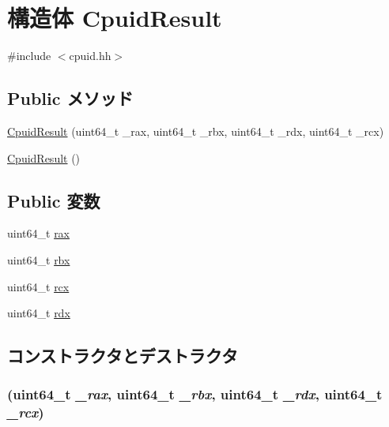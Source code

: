 \hypertarget{structX86ISA_1_1CpuidResult}{
\section{構造体 CpuidResult}
\label{structX86ISA_1_1CpuidResult}
}


{\ttfamily \#include $<$cpuid.hh$>$}\subsection*{Public メソッド}
\begin{DoxyCompactItemize}
\item 
\hyperlink{structX86ISA_1_1CpuidResult_a11f83822fc21427409a8828ac1ac953a}{CpuidResult} (uint64\_\-t \_\-rax, uint64\_\-t \_\-rbx, uint64\_\-t \_\-rdx, uint64\_\-t \_\-rcx)
\item 
\hyperlink{structX86ISA_1_1CpuidResult_abdcc885897d6f2205cb24c21b197588c}{CpuidResult} ()
\end{DoxyCompactItemize}
\subsection*{Public 変数}
\begin{DoxyCompactItemize}
\item 
uint64\_\-t \hyperlink{structX86ISA_1_1CpuidResult_afae317c0ec04889d6c9452dc30711975}{rax}
\item 
uint64\_\-t \hyperlink{structX86ISA_1_1CpuidResult_a49647568f68fbd9082c6be345350f483}{rbx}
\item 
uint64\_\-t \hyperlink{structX86ISA_1_1CpuidResult_a914f17516921c8917ca4a809893138d6}{rcx}
\item 
uint64\_\-t \hyperlink{structX86ISA_1_1CpuidResult_a7e87c5e2faab8a404c01084ddeed4588}{rdx}
\end{DoxyCompactItemize}


\subsection{コンストラクタとデストラクタ}
\hypertarget{structX86ISA_1_1CpuidResult_a11f83822fc21427409a8828ac1ac953a}{
\subsubsection[{CpuidResult}]{ (uint64\_\-t {\em \_\-rax}, \/  uint64\_\-t {\em \_\-rbx}, \/  uint64\_\-t {\em \_\-rdx}, \/  uint64\_\-t {\em \_\-rcx})}}
\label{structX86ISA_1_1CpuidResult_a11f83822fc21427409a8828ac1ac953a}



